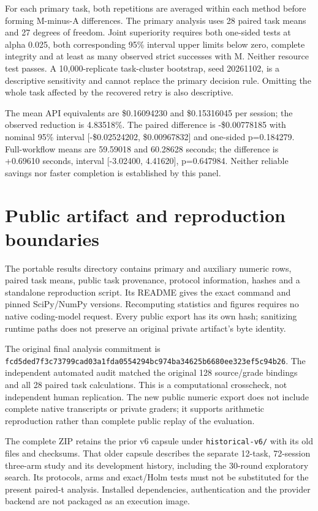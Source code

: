 \documentclass[manuscript,screen,nonacm]{acmart}
\begin{document}
For each primary task, both repetitions are averaged within each method
before forming M-minus-A differences. The primary analysis uses 28
paired task means and 27 degrees of freedom. Joint superiority requires
both one-sided tests at alpha 0.025, both corresponding 95\% interval
upper limits below zero, complete integrity and at least as many
observed strict successes with M. Neither resource test passes. A
10,000-replicate task-cluster bootstrap, seed 20261102, is a descriptive
sensitivity and cannot replace the primary decision rule. Omitting the
whole task affected by the recovered retry is also descriptive.

The mean API equivalents are \$0.16094230 and \$0.15316045 per session;
the observed reduction is 4.83518\%. The paired difference is
-\$0.00778185 with nominal 95\% interval {[}-\$0.02524202,
\$0.00967832{]} and one-sided p=0.184279. Full-workflow means are
59.59018 and 60.28628 seconds; the difference is +0.69610 seconds,
interval {[}-3.02400, 4.41620{]}, p=0.647984. Neither reliable savings
nor faster completion is established by this panel.

\section{Public artifact and reproduction
boundaries}\label{public-artifact-and-reproduction-boundaries}

The portable results directory contains primary and auxiliary numeric
rows, paired task means, public task provenance, protocol information,
hashes and a standalone reproduction script. Its README gives the exact
command and pinned SciPy/NumPy versions. Recomputing statistics and
figures requires no native coding-model request. Every public export has
its own hash; sanitizing runtime paths does not preserve an original
private artifact's byte identity.

The original final analysis commitment is
\nolinkurl{fcd5ded7f3c73799cad03a1fda0554294bc974ba34625b6680ee323ef5c94b26}.
The independent automated audit matched the original 128 source/grade
bindings and all 28 paired task calculations. This is a computational
crosscheck, not independent human replication. The new public numeric
export does not include complete native transcripts or private graders;
it supports arithmetic reproduction rather than complete public replay
of the evaluation.

The complete ZIP retains the prior v6 capsule under
\texttt{historical-v6/} with its old files and checksums. That older
capsule describes the separate 12-task, 72-session three-arm study and
its development history, including the 30-round exploratory search. Its
protocols, arms and exact/Holm tests must not be substituted for the
present paired-t analysis. Installed dependencies, authentication and
the provider backend are not packaged as an execution image.
\end{document}
